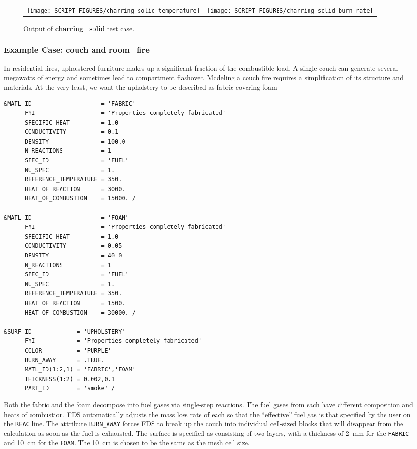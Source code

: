 \documentclass[11pt]{book}
\newcommand{\ct}{\tt\small}
\begin{document}
\begin{figure}[ht]
\begin{tabular*}{\textwidth}{lr}
\texttt{[image: SCRIPT\_FIGURES/charring\_solid\_temperature]} &
\texttt{[image: SCRIPT\_FIGURES/charring\_solid\_burn\_rate]}
\end{tabular*}
\caption[Output of {\bf charring\_solid} test case.]{Output of {\bf charring\_solid} test case.}
\label{charring_solid}
\end{figure}



\subsubsection{Example Case: couch and room\_fire}

In residential fires, upholstered furniture makes up a significant
fraction of the combustible load. A single couch can generate several
megawatts of energy and sometimes lead to compartment flashover. Modeling
a couch fire requires a simplification of its structure and materials.
At the very least, we want the upholstery to be described as fabric covering foam:

\footnotesize
\begin{verbatim}
&MATL ID                    = 'FABRIC'
      FYI                   = 'Properties completely fabricated'
      SPECIFIC_HEAT         = 1.0
      CONDUCTIVITY          = 0.1
      DENSITY               = 100.0
      N_REACTIONS           = 1
      SPEC_ID               = 'FUEL'
      NU_SPEC               = 1.
      REFERENCE_TEMPERATURE = 350.
      HEAT_OF_REACTION      = 3000.
      HEAT_OF_COMBUSTION    = 15000. /

&MATL ID                    = 'FOAM'
      FYI                   = 'Properties completely fabricated'
      SPECIFIC_HEAT         = 1.0
      CONDUCTIVITY          = 0.05
      DENSITY               = 40.0
      N_REACTIONS           = 1
      SPEC_ID               = 'FUEL'
      NU_SPEC               = 1.
      REFERENCE_TEMPERATURE = 350.
      HEAT_OF_REACTION      = 1500.
      HEAT_OF_COMBUSTION    = 30000. /

&SURF ID             = 'UPHOLSTERY'
      FYI            = 'Properties completely fabricated'
      COLOR          = 'PURPLE'
      BURN_AWAY      = .TRUE.
      MATL_ID(1:2,1) = 'FABRIC','FOAM'
      THICKNESS(1:2) = 0.002,0.1
      PART_ID        = 'smoke' /
\end{verbatim} \normalsize

\noindent
Both the fabric and the foam decompose into fuel gases via
single-step reactions. The fuel gases from each have different
composition and heats of combustion. FDS automatically adjusts
the mass loss rate of each so that the ``effective'' fuel gas
is that specified by the user on the {\ct REAC} line. The attribute
{\ct BURN\_AWAY} forces FDS to break up the couch into
individual cell-sized blocks that will disappear from the calculation
as soon as the fuel is exhausted. The surface is specified
as consisting of two layers, with a thickness of 2~mm for the {\ct FABRIC}
and 10~cm for the {\ct FOAM}. The 10~cm is chosen to be the
same as the mesh cell size.
\end{document}
